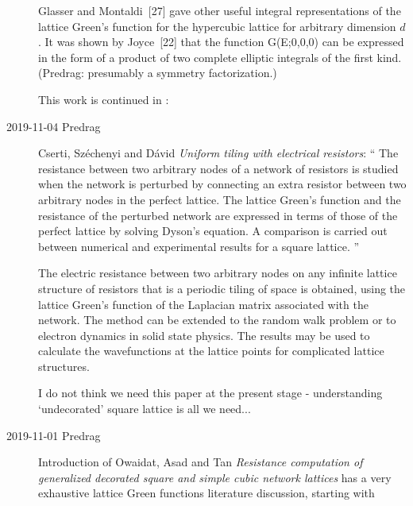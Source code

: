 \begin{description}
Glasser and Montaldi~[27] gave other useful integral representations
of the lattice Green's function for the hypercubic lattice
for arbitrary dimension $d$.
It was shown by Joyce~[22] that the function G(E;0,0,0) can
be expressed in the form of a product of two complete elliptic
integrals of the first kind. (Predrag: presumably a symmetry factorization.)



This work is continued in :

\item[2019-11-04 Predrag]
Cserti, Sz{\'{e}}chenyi and D{\'{a}}vid
{\em Uniform tiling with electrical resistors}:
``
The resistance between two arbitrary nodes of a network of resistors is
studied when the network is perturbed by connecting an extra resistor
between two arbitrary nodes in the perfect lattice. The lattice Green's
function and the resistance of the perturbed network are expressed in
terms of those of the perfect lattice by solving Dyson's equation. A
comparison is carried out between numerical and experimental results for
a square lattice.
''

The electric resistance between two arbitrary nodes on any infinite
lattice structure of resistors that is a periodic tiling of space is
obtained, using the lattice Green's function
of the Laplacian matrix associated with the network.
The method can be extended to the random walk problem or to
electron dynamics in solid state physics.
The results may be used to calculate the wavefunctions at the lattice
points for complicated lattice structures.

I do not think we need this paper at the present stage - understanding
`undecorated' square lattice is all we need...




\item[2019-11-01 Predrag]
Introduction of Owaidat, Asad and Tan {\em Resistance
computation of generalized decorated square and simple cubic network
lattices} has a very exhaustive lattice Green functions literature
discussion, starting with


\end{description}
